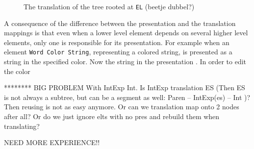 \begin{figure}
\begin{center}
\begin{center}
%
%
\end{center}
\caption{The translation of the tree rooted at {\tt EL} (beetje dubbel?)}\label{elementTranslation} 
\end{center}
\end{figure}

A consequence of the difference between the presentation and the translation mappings is that even when a lower level element depends on several higher level elements, only one is responsible for its presentation. For example when an element \verb|Word Color String|, representing a colored string, is presented as a string in the specified color. Now the string in the presentation . In order to edit the color

   


******** BIG PROBLEM With IntExp  Int. 
Is IntExp translation ES (Then ES is not always a subtree, but can be a segment as well: Paren -- IntExp(es) -- Int )? Then reusing is not as easy anymore.
Or can we translation map onto 2 nodes after all?
Or do we just ignore elts with no pres and rebuild them when translating?

NEED MORE EXPERIENCE!!

%
%



\fromHere  %

